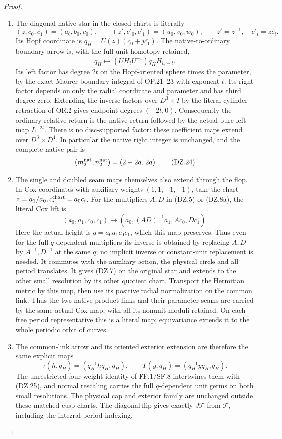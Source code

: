 \begin{proof}
\begin{enumerate}[label=\arabic*.]
\item The diagonal native star in the closed charts is literally
\[
 (z,c_0,c_1)=(a_0,b_0,c_0),\qquad
 (z',c'_0,c'_1)=(u_0,v_0,w_0),\qquad
                  z'=z^{-1},\quad c'_i=zc_i.
\]
Its Hopf coordinate is
\(q_H=U(z)(c_0+j\overline{c_1})\).
The native-to-ordinary boundary arrow is, with the full unit
homotopy retained,
\[
 q_H\longmapsto
       (U H_t U^{-1})q_H H_{l_2-t}.                 \tag{DZ.23}
\]
Its left factor has degree \(2t\) on the Hopf-oriented sphere
times the parameter, by the exact Maurer boundary integral of
OP.21--23 with exponent \(t\). Its right factor depends on only
the radial coordinate and parameter and has third degree zero.
Extending the inverse factors over \(D^3\times I\) by the
literal cylinder retraction of OR.2 gives endpoint degrees
\((-2t,0)\). Consequently the ordinary relative return is the
native return followed by the actual pure-left map \(L^{-2t}\).
There is no disc-supported factor: these coefficient maps extend
over \(D^3\times D^4\). In particular the native right integer is
unchanged, and the complete native pair is
\[
                        (m_2^{\rm nat},n_2^{\rm nat})
                                      =(2-2a,\,2a). \tag{DZ.24}
\]

\item The single and doubled seam maps themselves also extend through
the flop. In Cox
coordinates with auxiliary weights \((1,1,-1,-1)\), take the
chart \(z=a_1/a_0,c_i^{\rm chart}=a_0c_i\).
For the multipliers \(A,D\) in (DZ.5) or (DZ.8a), the literal Cox lift is
\[
 (a_0,a_1,c_0,c_1)\longmapsto
       (a_0,(AD)^{-1}a_1,Ac_0,Dc_1).               \tag{DZ.25}
\]
Here the actual height is \(q=a_0a_1c_0c_1\), which this map
preserves. Thus even for the full \(q\)-dependent multipliers its
inverse is obtained by replacing \(A,D\) by \(A^{-1},D^{-1}\)
at the same \(q\); no implicit inverse or constant-unit
replacement is needed.
It commutes with the auxiliary action, the physical circle and
all period translates. It gives (DZ.7) on the original star and
extends to the other small resolution by its other quotient
chart. Transport the Hermitian metric by this map, then use its
positive radial normalization on the common link. Thus the
two native product links and their parameter seams are carried
by the same actual Cox map, with all its nonunit moduli retained.
On each free period representative this is a literal map;
equivariance extends it to the whole periodic orbit of curves.

\item The common-link arrow and its oriented exterior extension are
therefore the same explicit maps
\[
 \tau(h,q_H)=(q_H^{-1}hq_H,q_H),\qquad
 T(y,q_H)=(q_H^{-1}yq_H,q_H) .
\]
The unrestricted four-weight identity of FF.1/SF.8 intertwines
them with (DZ.25), and normal rescaling carries the full
\(q\)-dependent unit germs on both small resolutions. The
physical cap and exterior family are unchanged outside these
matched cusp charts. The diagonal flip gives exactly
\(J\mathcal T\) from \(\mathcal T\), including the integral
period indexing.


\end{enumerate}
\end{proof}
